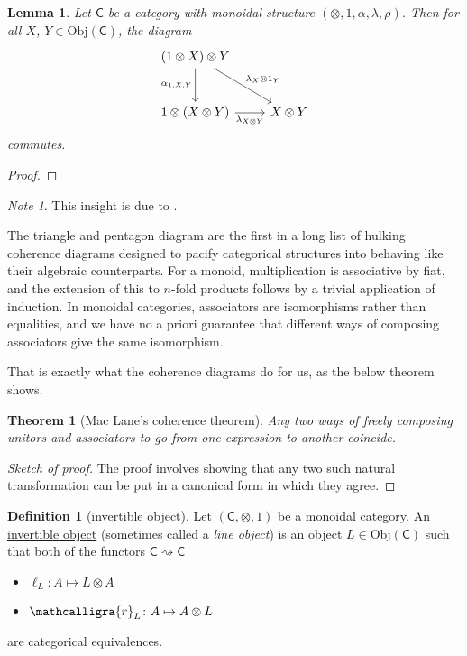 \documentclass[a4paper]{report}
\newcommand{\sr}{\ensuremath{\mathcalligra{r}}}
\newcommand{\defn}[1]{\ul{#1}}
\newcommand{\Obj}{\mathrm{Obj}}
\theoremstyle{definition}
\newtheorem{definition}{Definition}[section]
\theoremstyle{plain}
\newtheorem{theorem}{Theorem}[section]
\newtheorem{lemma}{Lemma}[section]
\theoremstyle{remark}
\newtheorem{note}{Note}[section]
\begin{document}
\begin{lemma}
  Let $\mathsf{C}$ be a category with monoidal structure $(\otimes, 1, \alpha, \lambda, \rho)$. Then for all $X$, $Y \in \Obj(\mathsf{C})$, the diagram
  \begin{equation*}
    \begin{tikzcd}[row sep=large]
      (1 \otimes X) \otimes Y 
      \arrow[d, swap, "{\alpha_{1, X, Y}}"]
      \arrow[dr, "\lambda_{X} \otimes 1_{Y}"]
      & 
      \\
      1 \otimes (X \otimes Y)
      \arrow[r, swap, "\lambda_{X \otimes Y}"]
      & X \otimes Y
    \end{tikzcd}
  \end{equation*}
  commutes.
\end{lemma}
\begin{proof}

\end{proof}

\begin{note}
  This insight is due to \cite{unapolagetic-mathematician-mac-lanes-theorem}.

  The triangle and pentagon diagram are the first in a long list of hulking coherence diagrams designed to pacify categorical structures into behaving like their algebraic counterparts. For a monoid, multiplication is associative by fiat, and the extension of this to $n$-fold products follows by a trivial application of induction. In monoidal categories, associators are isomorphisms rather than equalities, and we have no a priori guarantee that different ways of composing associators give the same isomorphism. 

  That is exactly what the coherence diagrams do for us, as the below theorem shows.
\end{note}

\begin{theorem}[Mac Lane's coherence theorem]
  Any two ways of freely composing unitors and associators to go from one expression to another coincide.
\end{theorem}

\begin{proof}[Sketch of proof]
  The proof involves showing that any two such natural transformation can be put in a canonical form in which they agree.
\end{proof}

\begin{definition}[invertible object]
  \label{def:invertibleobject}
  Let $(\mathsf{C}, \otimes, 1)$ be a monoidal category. An \defn{invertible object} (sometimes called a \emph{line object}) is an object $L \in \Obj(\mathsf{C})$ such that both of the functors $\mathsf{C} \rightsquigarrow \mathsf{C}$
  \begin{itemize}
    \item $\ell_{L}\colon A \mapsto L \otimes A$ 
    \item $\sr_{L}\colon A \mapsto A \otimes L$
  \end{itemize}
  are categorical equivalences.
\end{definition}
\end{document}

